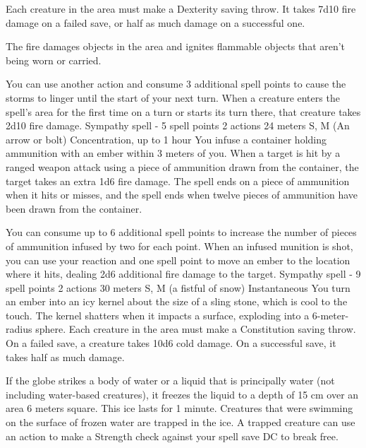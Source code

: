     Each creature in the area must make a Dexterity saving throw.
    It takes 7d10 fire damage on a failed save, or half as much damage on a successful one.

    The fire damages objects in the area and ignites flammable objects that aren't being worn or carried.

    You can use another action and consume 3 additional spell points to cause the storms to linger until the start of your next turn.
    When a creature enters the spell's area for the first time on a turn or starts its turn there, that creature takes 2d10 fire damage.
    {Sympathy spell - 5 spell points}
    {2 actions}
    {24 meters}
    {S, M (An arrow or bolt)}
    {Concentration, up to 1 hour}
    You infuse a container holding ammunition with an ember within 3 meters of you.
    When a target is hit by a ranged weapon attack using a piece of ammunition drawn from the container, the target takes an extra 1d6 fire damage.
    The spell ends on a piece of ammunition when it hits or misses, and the spell ends when twelve pieces of ammunition have been drawn from the container.

    You can consume up to 6 additional spell points to increase the number of pieces of ammunition infused by two for each point.
    When an infused munition is shot, you can use your reaction and one spell point to move an ember to the location where it hits, dealing 2d6 additional fire damage to the target.
    {Sympathy spell - 9 spell points}
    {2 actions}
    {30 meters}
    {S, M (a fistful of snow)}
    {Instantaneous}
    You turn an ember into an icy kernel about the size of a sling stone, which is cool to the touch.
    The kernel shatters when it impacts a surface, exploding into a 6-meter-radius sphere.
    Each creature in the area must make a Constitution saving throw.
    On a failed save, a creature takes 10d6 cold damage.
    On a successful save, it takes half as much damage.

    If the globe strikes a body of water or a liquid that is principally water (not including water-based creatures), it freezes the liquid to a depth of 15 cm over an area 6 meters square.
    This ice lasts for 1 minute.
    Creatures that were swimming on the surface of frozen water are trapped in the ice.
    A trapped creature can use an action to make a Strength check against your spell save DC to break free.

